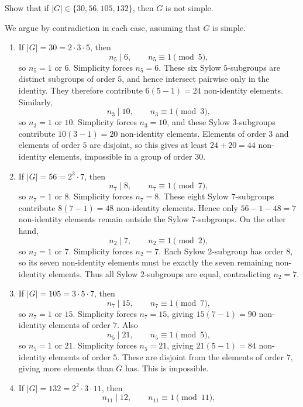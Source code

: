 \documentclass[../Odyssey_Project.tex]{subfiles}
\begin{document}
\begin{exercise}
\label{ex:7.11}
Show that if $|G| \in \{30, 56, 105, 132\}$, then $G$ is not simple.
\end{exercise}
\begin{solution}
    We argue by contradiction in each case, assuming that $G$ is simple.
    \phantom{}\par
    \begin{enumerate}
        \item If $|G|=30=2\cdot 3\cdot 5$, then
        \[
            n_5\mid 6,\qquad n_5\equiv 1\pmod 5,
        \]
        so $n_5=1$ or $6$. Simplicity forces $n_5=6$. These six Sylow $5$-subgroups are distinct subgroups of order $5$, and hence intersect pairwise only in the identity. They therefore contribute $6(5-1)=24$ non-identity elements. Similarly,
        \[
            n_3\mid 10,\qquad n_3\equiv 1\pmod 3,
        \]
        so $n_3=1$ or $10$. Simplicity forces $n_3=10$, and these Sylow $3$-subgroups contribute $10(3-1)=20$ non-identity elements. Elements of order $3$ and elements of order $5$ are disjoint, so this gives at least $24+20=44$ non-identity elements, impossible in a group of order $30$.
        \item If $|G|=56=2^3\cdot 7$, then
        \[
            n_7\mid 8,\qquad n_7\equiv 1\pmod 7,
        \]
        so $n_7=1$ or $8$. Simplicity forces $n_7=8$. These eight Sylow $7$-subgroups contribute $8(7-1)=48$ non-identity elements. Hence only $56-1-48=7$ non-identity elements remain outside the Sylow $7$-subgroups. On the other hand,
        \[
            n_2\mid 7,\qquad n_2\equiv 1\pmod 2,
        \]
        so $n_2=1$ or $7$. Simplicity forces $n_2=7$. Each Sylow $2$-subgroup has order $8$, so its seven non-identity elements must be exactly the seven remaining non-identity elements. Thus all Sylow $2$-subgroups are equal, contradicting $n_2=7$.
        \item If $|G|=105=3\cdot 5\cdot 7$, then
        \[
            n_7\mid 15,\qquad n_7\equiv 1\pmod 7,
        \]
        so $n_7=1$ or $15$. Simplicity forces $n_7=15$, giving $15(7-1)=90$ non-identity elements of order $7$. Also
        \[
            n_5\mid 21,\qquad n_5\equiv 1\pmod 5,
        \]
        so $n_5=1$ or $21$. Simplicity forces $n_5=21$, giving $21(5-1)=84$ non-identity elements of order $5$. These are disjoint from the elements of order $7$, giving more elements than $G$ has. This is impossible.
        \item If $|G|=132=2^2\cdot 3\cdot 11$, then
        \[
            n_{11}\mid 12,\qquad n_{11}\equiv 1\pmod {11},
\]
\end{enumerate}
\end{solution}
\end{document}
